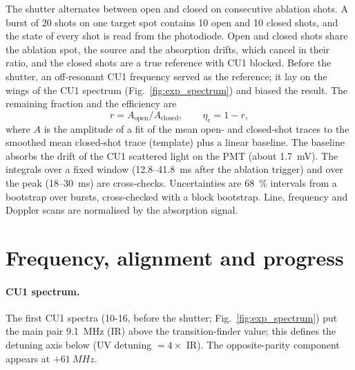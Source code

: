 \documentclass[11pt,a4paper,oneside]{report}
\newcommand{\etac}{\eta_{\mathrm{c}}}
\begin{document}
The shutter alternates between open and closed on consecutive ablation shots. A burst of 20 shots on
one target spot contains 10 open and 10 closed shots, and the state of every shot is read from the
photodiode. Open and closed shots share the ablation spot, the source and the absorption drifts,
which cancel in their ratio, and the closed shots are a true reference with CU1 blocked. Before the
shutter, an off-resonant CU1 frequency served as the reference; it lay on the wings of the CU1
spectrum (Fig.~\ref{fig:exp_spectrum}) and biased the result. The remaining fraction and the
efficiency are
\begin{equation}
  r=A_{\mathrm{open}}/A_{\mathrm{closed}},\qquad \etac=1-r,
\end{equation}
where $A$ is the amplitude of a fit of the mean open- and closed-shot traces to the smoothed mean
closed-shot trace (template) plus a linear baseline. The baseline absorbs the drift of the CU1
scattered light on the PMT (about \SI{1.7}{mV}). The integrals over a fixed window (12.8--\SI{41.8}{ms}
after the ablation trigger) and over the peak (18--\SI{30}{ms}) are cross-checks. Uncertainties are
\SI{68}{\percent} intervals from a bootstrap over bursts, cross-checked with a block bootstrap. Line,
frequency and Doppler scans are normalised by the absorption signal.

\section{Frequency, alignment and progress}
\label{sec:exp_progress}

\paragraph{CU1 spectrum.} The first CU1 spectra (10-16, before the shutter; Fig.~\ref{fig:exp_spectrum})
put the main pair \SI{9.1}{MHz} (IR) above the transition-finder value; this defines the detuning axis
below (UV detuning $=4\times$ IR). The opposite-parity component appears at $+\SI{61}{MHz}$.
\end{document}
